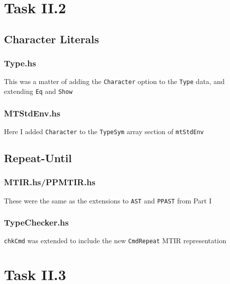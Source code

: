 \documentclass[12pt]{article}
\newcommand{\lstin}[3]{
  
}
\begin{document}
\maketitle
\tableofcontents
\pagebreak
\section{Task II.2}
\subsection{Character Literals}
\subsubsection{Type.hs}
This was a matter of adding the \verb|Character| option to the \verb|Type| data, and extending \verb|Eq| and \verb|Show|

\lstin{67}{81}{Type.hs}
\lstin{91}{97}{Type.hs}
\lstin{180}{185}{Type.hs}

\subsubsection{MTStdEnv.hs}
Here I added \verb|Character| to the \verb|TypeSym| array section of \verb|mtStdEnv|

\lstin{64}{68}{MTStdEnv.hs}

\subsection{Repeat-Until}

\subsubsection{MTIR.hs/PPMTIR.hs}
These were the same as the extensions to \verb|AST| and \verb|PPAST| from Part I

\lstin{84}{89}{MTIR.hs}
\lstin{69}{72}{PPMTIR.hs}

\subsubsection{TypeChecker.hs}
\verb|chkCmd| was extended to include the new \verb|CmdRepeat| MTIR representation

\lstin{120}{123}{TypeChecker.hs}

\pagebreak

\section{Task II.3}
\end{document}
